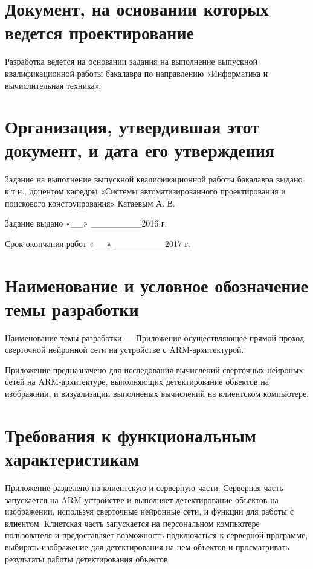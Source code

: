 \documentclass[a4paper,english]{G2-105}
\begin{document}
\ttl \ttl
\section{Документ, на основании которых ведется проектирование}\ttl
\par Разработка ведется на основании задания на выполнение выпускной квалификационной работы бакалавра по направлению «Информатика и вычислительная техника».
\ttl
\section{Организация, утвердившая этот документ, и дата его утверждения} \ttl
Задание на выполнение выпускной квалификационной работы бакалавра выдано к.т.н., доцентом кафедры «Системы автоматизированного проектирования и поискового конструирования» Катаевым А. В.
\par Задание выдано «\_\_» \_\_\_\_\_\_\_\_2016 г.
\par Срок окончания работ «\_\_» \_\_\_\_\_\_\_\_2017 г.
\ttl

\section{Наименование и условное обозначение темы разработки}\ttl
\par Наименование темы разработки --- Приложение осуществляющее прямой проход сверточной нейронной сети на устройстве с ARM-архитектурой. \ttl \ttl \ttl

 \ttl
\par Приложение предназначено для исследования вычислений сверточных нейроных сетей на ARM-архитектуре, выполняющих детектирование объектов на изображнии, и визуализации выполненых вычислений на клиентском компьютере.
\ttl \ttl \ttl
{} \ttl \ttl
\section{Требования к функциональным характеристикам} \ttl
\par Приложение разделено на клиентскую и серверную части. Серверная часть запускается на ARM-устройстве и выполняет детектирование объектов на изображении, используя сверточные нейронные сети, и функции для работы с клиентом. Клиетская часть запускается на персональном компьютере пользователя и предоставляет возможность подключаться к серверной программе, выбирать изображение для детектирования на нем объектов и просматривать результаты работы детектирования объектов. \ttl
\end{document}
